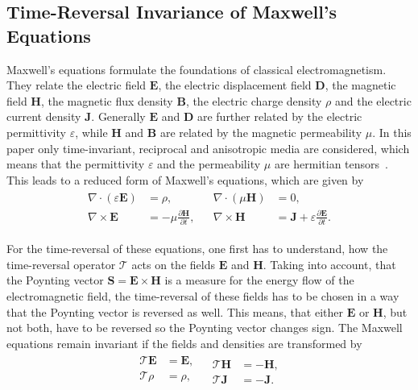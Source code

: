 \subsection{Time-Reversal Invariance of Maxwell's Equations}
Maxwell's equations formulate the foundations of classical electromagnetism.
They relate the electric field \(\bm{E}\), the electric displacement field \(\bm{D}\), the magnetic field \(\bm{H}\), the magnetic flux density \(\bm{B}\), the electric charge density \(\rho \) and the electric current density \({\bm{J}}\).
Generally \(\bm{E}\) and \(\bm{D}\) are further related by the electric permittivity \(\varepsilon \), while \(\bm{H}\) and \(\bm{B}\) are related by the magnetic permeability \(\mu \).
In this paper only time-invariant, reciprocal and anisotropic media are considered, which means that the permittivity \(\varepsilon \) and the permeability \(\mu \) are hermitian tensors~\parencite{krowne_electromagnetic_1984}.
This leads to a reduced form of Maxwell's equations, which are given by
\begin{align}
    \begin{split}
        \nabla \cdot (\varepsilon \bm{E}) &= \rho, \\
        \nabla \times \bm{E} &= -\mu \frac{\partial \bm{H}}{\partial t},
    \end{split}
    &
    \begin{split}
        \nabla \cdot (\mu \bm{H}) &= 0, \\
        \nabla \times \bm{H} &= \bm{J} + \varepsilon \frac{\partial \bm{E}}{\partial t}.
    \end{split}
\end{align}

For the time-reversal of these equations, one first has to understand, how the time-reversal operator \(\mathcal{T}\) acts on the fields \(\bm{E}\) and \(\bm{H}\).
Taking into account, that the Poynting vector \(\bm{S} = \bm{E} \times \bm{H}\) is a measure for the energy flow of the electromagnetic field, the time-reversal of these fields has to be chosen in a way that the Poynting vector is reversed as well.
This means, that either \(\bm{E}\) or \(\bm{H}\), but not both, have to be reversed so the Poynting vector changes sign. 
The Maxwell equations remain invariant if the fields and densities are transformed by~\parencite{sigwarth_time_2022}
\begin{align}
    \begin{split}
        \mathcal{T}\bm{E} &= \bm{E}, \\
        \mathcal{T}\rho &= \rho, \\
    \end{split}
    &
    \begin{split}
        \mathcal{T}\bm{H} &= -\bm{H}, \\
        \mathcal{T}{\bm{J}} &= -{\bm{J}}.
    \end{split}
\end{align}

